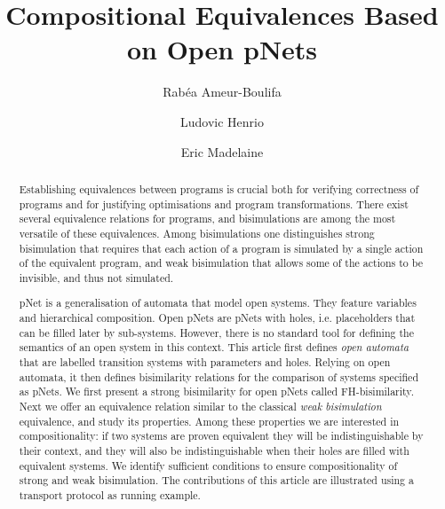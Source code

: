 \documentclass{elsarticle}
\begin{document}
\title{Compositional Equivalences Based on Open pNets
}
\author{Rab\'ea Ameur-Boulifa}
\address{LTCI, T\'el\'ecom Paris, Institut Polytechnique de Paris, France
}         

\author{Ludovic Henrio}
\address{Univ Lyon, EnsL, UCBL, CNRS, Inria,  LIP, F-69342, LYON Cedex 07, France.}

\author{Eric Madelaine}
\address{INRIA Sophia Antipolis M\'edit\'erann\'ee, UCA, BP 93, 06902 Sophia Antipolis, France}


\begin{abstract}

Establishing equivalences between programs  is crucial both for verifying correctness of programs and for justifying optimisations and program transformations. There exist several equivalence relations for programs, and bisimulations are among the most versatile of these equivalences. Among bisimulations one distinguishes strong bisimulation that requires that each action of a program is simulated by a single action of the equivalent program, and weak bisimulation that  allows some of the actions to be
  invisible, and thus not simulated.

pNet is a generalisation of automata that model open systems. They feature variables and hierarchical composition. Open pNets are pNets with holes, i.e. placeholders   that can be filled later by sub-systems. 
However, there is no standard tool for defining the semantics of an open system in this context. This article first defines \emph{open automata} that are labelled transition systems with parameters and holes.
Relying on open automata, it then defines bisimilarity relations  for the comparison of systems specified as pNets.
 We first present a strong bisimilarity for open pNets called FH-bisimilarity.
Next we offer an equivalence relation similar to
  the classical \emph{weak bisimulation} equivalence, and study its properties.
Among these properties we are interested in compositionality: if two systems are proven equivalent they will be indistinguishable by their context, and they will also be indistinguishable when their holes are filled with equivalent systems.
We identify sufficient conditions to ensure compositionality of strong and weak bisimulation.
The contributions of this article are illustrated using a transport protocol as running example.
\end{abstract}
\end{document}

